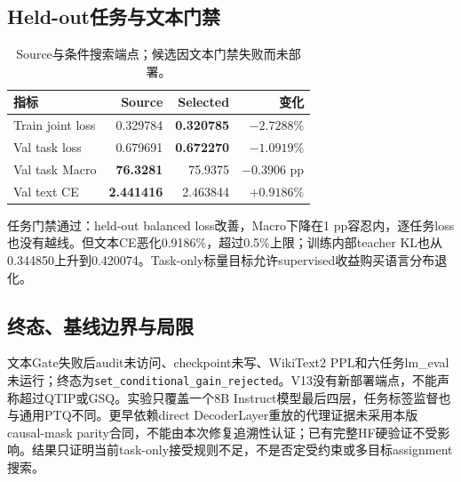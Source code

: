 \subsection{Held-out任务与文本门禁}

\begin{table}[t]
\centering
\small
\caption{Source与条件搜索端点；候选因文本门禁失败而未部署。}
\begin{tabular}{lrrr}
\toprule
指标 & Source & Selected & 变化\\
\midrule
Train joint loss & 0.329784 & \textbf{0.320785} & $-2.7288\%$\\
Val task loss & 0.679691 & \textbf{0.672270} & $-1.0919\%$\\
Val task Macro & \textbf{76.3281} & 75.9375 & $-0.3906$ pp\\
Val text CE & \textbf{2.441416} & 2.463844 & $+0.9186\%$\\
\bottomrule
\end{tabular}
\end{table}

任务门禁通过：held-out balanced loss改善，Macro下降在1 pp容忍内，逐任务loss也没有越线。但文本CE恶化0.9186\%，超过0.5\%上限；训练内部teacher KL也从0.344850上升到0.420074。Task-only标量目标允许supervised收益购买语言分布退化。

\subsection{终态、基线边界与局限}

文本Gate失败后audit未访问、checkpoint未写、WikiText2 PPL和六任务lm\_eval未运行；终态为\texttt{set\_conditional\_gain\_rejected}。V13没有新部署端点，不能声称超过QTIP或GSQ。实验只覆盖一个8B Instruct模型最后四层，任务标签监督也与通用PTQ不同。更早依赖direct DecoderLayer重放的代理证据未采用本版causal-mask parity合同，不能由本次修复追溯性认证；已有完整HF硬验证不受影响。结果只证明当前task-only接受规则不足，不是否定受约束或多目标assignment搜索。

